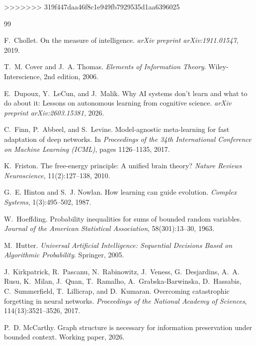 \documentclass[11pt]{article}
\theoremstyle{definition}
\begin{document}
>>>>>>> 319f447daa46f8c1e949fb7929535d1aa6396025

\begin{thebibliography}{99}

F.~Chollet.
\newblock On the measure of intelligence.
\newblock \emph{arXiv preprint arXiv:1911.01547}, 2019.

T.~M. Cover and J.~A. Thomas.
\newblock \emph{Elements of Information Theory}.
\newblock Wiley-Interscience, 2nd edition, 2006.

E.~Dupoux, Y.~LeCun, and J.~Malik.
\newblock Why {AI} systems don't learn and what to do about it: Lessons on
  autonomous learning from cognitive science.
\newblock \emph{arXiv preprint arXiv:2603.15381}, 2026.

C.~Finn, P.~Abbeel, and S.~Levine.
\newblock Model-agnostic meta-learning for fast adaptation of deep networks.
\newblock In \emph{Proceedings of the 34th International Conference on Machine
  Learning (ICML)}, pages 1126--1135, 2017.

K.~Friston.
\newblock The free-energy principle: A unified brain theory?
\newblock \emph{Nature Reviews Neuroscience}, 11(2):127--138, 2010.

G.~E. Hinton and S.~J. Nowlan.
\newblock How learning can guide evolution.
\newblock \emph{Complex Systems}, 1(3):495--502, 1987.

W.~Hoeffding.
\newblock Probability inequalities for sums of bounded random variables.
\newblock \emph{Journal of the American Statistical Association},
  58(301):13--30, 1963.

M.~Hutter.
\newblock \emph{Universal Artificial Intelligence: Sequential Decisions Based
  on Algorithmic Probability}.
\newblock Springer, 2005.

J.~Kirkpatrick, R.~Pascanu, N.~Rabinowitz, J.~Veness, G.~Desjardins,
  A.~A. Rusu, K.~Milan, J.~Quan, T.~Ramalho, A.~Grabska-Barwinska,
  D.~Hassabis, C.~Summerfield, T.~Lillicrap, and D.~Kumaran.
\newblock Overcoming catastrophic forgetting in neural networks.
\newblock \emph{Proceedings of the National Academy of Sciences},
  114(13):3521--3526, 2017.

P.~D. McCarthy.
\newblock Graph structure is necessary for information preservation under
  bounded context.
\newblock Working paper, 2026.


\end{thebibliography}
\end{document}

